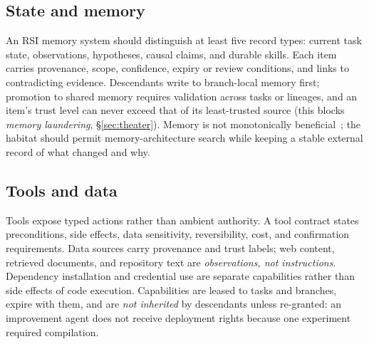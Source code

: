 \documentclass[11pt,a4paper]{article}
\begin{document}
\subsection{State and memory}
An RSI memory system should distinguish at least five record types: current task state, observations, hypotheses, causal claims, and durable skills. Each item carries provenance, scope, confidence, expiry or review conditions, and links to contradicting evidence. Descendants write to branch-local memory first; promotion to shared memory requires validation across tasks or lineages, and an item's trust level can never exceed that of its least-trusted source (this blocks \emph{memory laundering}, \S\ref{sec:theater}). Memory is not monotonically beneficial~\cite{du2026automem,yu2026recuris}; the habitat should permit memory-architecture search while keeping a stable external record of what changed and why.

\subsection{Tools and data}
Tools expose typed actions rather than ambient authority. A tool contract states preconditions, side effects, data sensitivity, reversibility, cost, and confirmation requirements. Data sources carry provenance and trust labels; web content, retrieved documents, and repository text are \emph{observations, not instructions}. Dependency installation and credential use are separate capabilities rather than side effects of code execution. Capabilities are leased to tasks and branches, expire with them, and are \emph{not inherited} by descendants unless re-granted: an improvement agent does not receive deployment rights because one experiment required compilation.
\end{document}
